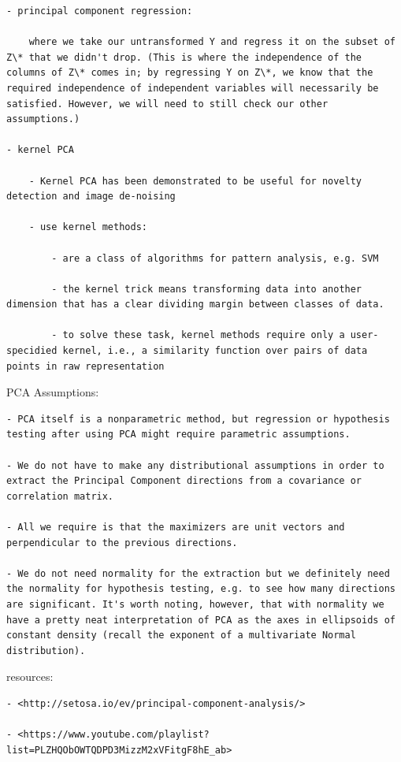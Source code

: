 \documentclass[
]{book}
\begin{document}
\begin{verbatim}
- principal component regression:

    where we take our untransformed Y and regress it on the subset of Z\* that we didn't drop. (This is where the independence of the columns of Z\* comes in; by regressing Y on Z\*, we know that the required independence of independent variables will necessarily be satisfied. However, we will need to still check our other assumptions.)

- kernel PCA

    - Kernel PCA has been demonstrated to be useful for novelty detection and image de-noising

    - use kernel methods:

        - are a class of algorithms for pattern analysis, e.g. SVM

        - the kernel trick means transforming data into another dimension that has a clear dividing margin between classes of data.

        - to solve these task, kernel methods require only a user-specidied kernel, i.e., a similarity function over pairs of data points in raw representation
\end{verbatim}

PCA Assumptions:

\begin{verbatim}
- PCA itself is a nonparametric method, but regression or hypothesis testing after using PCA might require parametric assumptions.

- We do not have to make any distributional assumptions in order to extract the Principal Component directions from a covariance or correlation matrix.

- All we require is that the maximizers are unit vectors and perpendicular to the previous directions.

- We do not need normality for the extraction but we definitely need the normality for hypothesis testing, e.g. to see how many directions are significant. It's worth noting, however, that with normality we have a pretty neat interpretation of PCA as the axes in ellipsoids of constant density (recall the exponent of a multivariate Normal distribution).
\end{verbatim}

resources:

\begin{verbatim}
- <http://setosa.io/ev/principal-component-analysis/>

- <https://www.youtube.com/playlist?list=PLZHQObOWTQDPD3MizzM2xVFitgF8hE_ab>
\end{verbatim}
\end{document}
